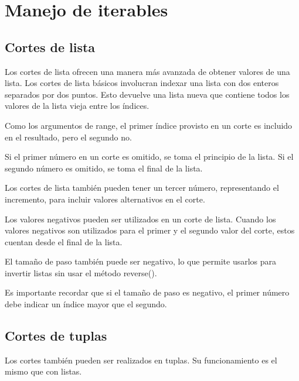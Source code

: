 \documentclass{report}
\begin{document}
{\clearpage\chapter{Manejo de iterables}

\section{Cortes de lista}

Los cortes de lista ofrecen una manera más avanzada de obtener valores de una lista. Los cortes de lista básicos involucran indexar una lista con dos enteros separados por dos puntos. Esto devuelve una lista nueva que contiene todos los valores de la lista vieja entre los índices.


Como los argumentos de range, el primer índice provisto en un corte es incluido en el resultado, pero el segundo no.

Si el primer número en un corte es omitido, se toma el principio de la lista. Si el segundo número es omitido, se toma el final de la lista.


Los cortes de lista también pueden tener un tercer número, representando el incremento, para incluir valores alternativos en el corte.


Los valores negativos pueden ser utilizados en un corte de lista. Cuando los valores negativos son utilizados para el primer y el segundo valor del corte, estos cuentan desde el final de la lista.


El tamaño de paso también puede ser negativo, lo que permite usarlos para invertir listas sin usar el método reverse().


Es importante recordar que si el tamaño de paso es negativo, el primer número debe indicar un índice mayor que el segundo.

\section{Cortes de tuplas}

Los cortes también pueden ser realizados en tuplas. Su funcionamiento es el mismo que con listas.

}
\end{document}
